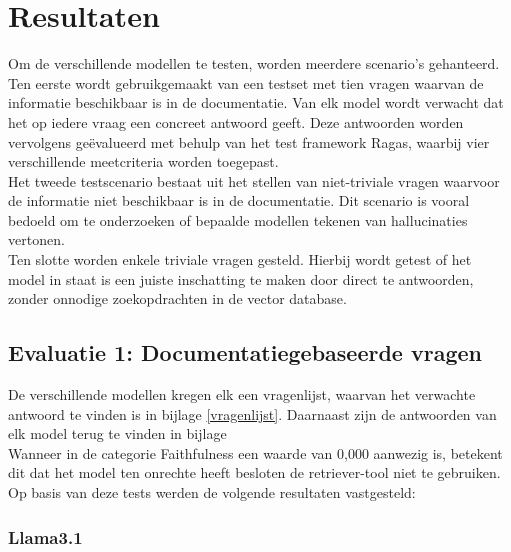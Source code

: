 
\chapter{Resultaten}
\label{ch:resultaten}

Om de verschillende modellen te testen, worden meerdere scenario’s gehanteerd.
Ten eerste wordt gebruikgemaakt van een testset met tien vragen waarvan de informatie beschikbaar is in de documentatie. Van elk model wordt verwacht dat het op iedere vraag een concreet antwoord geeft. Deze antwoorden worden vervolgens geëvalueerd met behulp van het test framework Ragas, waarbij vier verschillende meetcriteria worden toegepast.
\\[1em]
Het tweede testscenario bestaat uit het stellen van niet-triviale vragen waarvoor de informatie niet beschikbaar is in de documentatie. Dit scenario is vooral bedoeld om te onderzoeken of bepaalde modellen tekenen van hallucinaties vertonen.
\\[1em]
Ten slotte worden enkele triviale vragen gesteld. Hierbij wordt getest of het model in staat is een juiste inschatting te maken door direct te antwoorden, zonder onnodige zoekopdrachten in de vector database.


\section{Evaluatie 1: Documentatiegebaseerde vragen}

De verschillende modellen kregen elk een vragenlijst, waarvan het verwachte antwoord te vinden is in bijlage \ref{vragenlijst}. Daarnaast zijn de antwoorden van elk model terug te vinden in bijlage %
\\[1em]
Wanneer in de categorie Faithfulness een waarde van 0,000 aanwezig is, betekent dit dat het model ten onrechte heeft besloten de retriever-tool niet te gebruiken.
Op basis van deze tests werden de volgende resultaten vastgesteld:

\subsection{Llama3.1}

